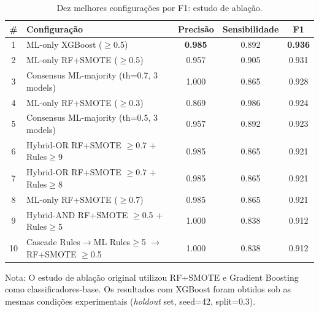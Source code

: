 \begin{table}[htbp]
\centering
\caption{Dez melhores configurações por F1: estudo de ablação.}
\label{tab:ablation-top10}
\small
\begin{tabular}{clccc}
\toprule
\# & Configuração & Precisão & Sensibilidade & F1 \\
\midrule
1 & ML-only XGBoost ($\geq$0.5) & \textbf{0.985} & 0.892 & \textbf{0.936} \\
2 & ML-only RF+SMOTE ($\geq$0.5) & 0.957 & 0.905 & 0.931 \\
3 & Consensus ML-majority (th=0.7, 3 models) & 1.000 & 0.865 & 0.928 \\
4 & ML-only RF+SMOTE ($\geq$0.3) & 0.869 & 0.986 & 0.924 \\
5 & Consensus ML-majority (th=0.5, 3 models) & 0.957 & 0.892 & 0.923 \\
6 & Hybrid-OR RF+SMOTE $\geq$0.7 + Rules$\geq$9 & 0.985 & 0.865 & 0.921 \\
7 & Hybrid-OR RF+SMOTE $\geq$0.7 + Rules$\geq$8 & 0.985 & 0.865 & 0.921 \\
8 & ML-only RF+SMOTE ($\geq$0.7) & 0.985 & 0.865 & 0.921 \\
9 & Hybrid-AND RF+SMOTE $\geq$0.5 + Rules$\geq$5 & 1.000 & 0.838 & 0.912 \\
10 & Cascade Rules$\rightarrow$ML Rules$\geq$5 $\rightarrow$ RF+SMOTE $\geq$0.5 & 1.000 & 0.838 & 0.912 \\
\bottomrule
\end{tabular}
\begin{tablenotes}
\small
\item Nota: O estudo de abla\c{c}\~ao original utilizou RF+SMOTE e Gradient Boosting como classificadores-base. Os resultados com XGBoost foram obtidos sob as mesmas condi\c{c}\~oes experimentais (\textit{holdout} set, seed=42, split=0.3).
\end{tablenotes}
\end{table}
